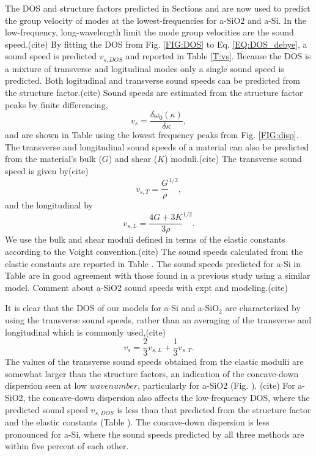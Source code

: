 \documentclass[aps,prb,twocolumn,superscriptaddress,footinbib,amsmath,amssymb,floatfix]{revtex4}
\begin{document}
The DOS and structure factors predicted in Sections and are now used to 
predict the group velocity of modes at the lowest-frequencies for 
a-SiO2 and a-Si. In the low-frequency, long-wavelength limit the 
mode group velocities are the sound speed.(cite) 
By fitting the DOS 
from Fig. \ref{FIG:DOS} to Eq. \eqref{EQ:DOS_debye}, 
a sound speed is predicted $v_{s,DOS}$ and 
reported in Table \ref{T:vs}. Because the DOS is a mixture of 
transverse and logitudinal modes only a single sound speed is predicted. 
Both logitudinal and transverse sound speeds can be predicted from 
the structure factor.(cite) 
Sound speeds are estimated from the structure factor peaks by finite 
differencing,\begin{equation}\label{EQ:vs_dwdk}
v_{s} = \frac{ \delta \omega_0(\kappa)}{\delta \kappa},
\end{equation}
and are shown in Table using the lowest frequency peaks 
from Fig. \ref{FIG:disp}. 
The transverse and longitudinal sound speeds of a material can 
also be predicted from the material's bulk ($G$) and 
shear ($K$) moduli.(cite) The transverse sound speed is given by(cite)  
\begin{equation}\label{EQ:vs_T_elas}
v_{s,T} = \frac{G}{\rho}^{1/2},
\end{equation}
and the longitudinal by
\begin{equation}\label{EQ:vs_L_elas}
v_{s,L} = \frac{4G + 3K}{3\rho}^{1/2}.
\end{equation}
We use the bulk and shear moduli defined in terms of the elastic 
constants according to the Voight convention.(cite) 
The sound speeds calculated from the 
elastic constants are reported in Table . 
The sound speeds predicted for a-Si in Table are in good agreement 
with those found in a previous study using a similar 
model.\cite{feldman_thermal_1993,feldman_numerical_1999} 
Comment about a-SiO2 sound speeds with expt and modeling.(cite)

It is clear that the DOS of 
our models for a-Si and a-SiO$_2$ are characterized by using the 
transverse sound speeds, rather than an averaging of the transverse 
and longitudinal which is commonly used,(cite)  
\begin{equation}\label{EQ:vs_avg}
v_{s} = \frac{2}{3}v_{s,L} + \frac{1}{3}v_{s,T}. 
\end{equation} 
The values of the transverse sound speeds obtained from the 
elastic modulii are somewhat larger than the structure factors, 
an indication of the concave-down dispersion seen at low 
$wavenumber$, particularly for a-SiO2 (Fig. ).
(cite) For a-SiO2, the concave-down dispersion
also affects the low-frequency DOS, where the predicted sound speed 
$v_{s,DOS}$ is less than that predicted from the structure factor 
and the elastic constants (Table ). The concave-down dispersion 
is less pronounced for a-Si, where the sound speeds predicted 
by all three methods are within five percent of each other. 
\end{document}
